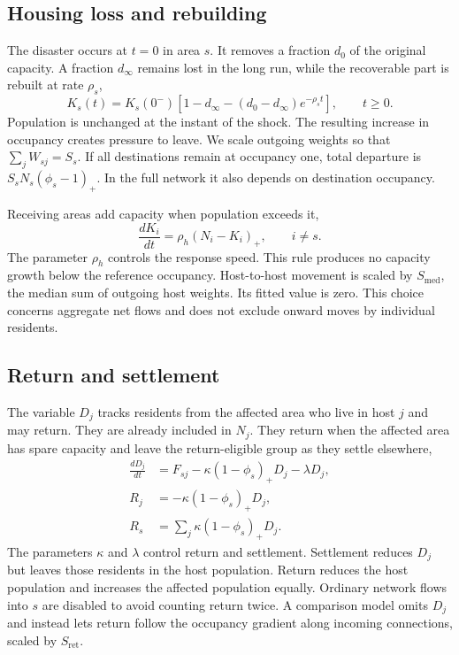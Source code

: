 \documentclass[11pt]{article}
\begin{document}
\subsection*{Housing loss and rebuilding}

The disaster occurs at $t=0$ in area $s$. It removes a fraction $d_0$ of the original capacity. A fraction $d_\infty$ remains lost in the long run, while the recoverable part is rebuilt at rate $\rho_s$,
\begin{equation}
K_s(t)=K_s(0^-)\left[1-d_\infty-(d_0-d_\infty)e^{-\rho_s t}\right],\qquad t\geq0.
\label{eq:Ks}
\end{equation}
Population is unchanged at the instant of the shock. The resulting increase in occupancy creates pressure to leave. We scale outgoing weights so that $\sum_jW_{sj}=S_s$. If all destinations remain at occupancy one, total departure is $S_sN_s(\phi_s-1)_+$. In the full network it also depends on destination occupancy.

Receiving areas add capacity when population exceeds it,
\begin{equation}
\frac{dK_i}{dt}=\rho_h(N_i-K_i)_+,\qquad i\ne s.
\label{eq:hosts}
\end{equation}
The parameter $\rho_h$ controls the response speed. This rule produces no capacity growth below the reference occupancy. Host-to-host movement is scaled by $S_{\text{med}}$, the median sum of outgoing host weights. Its fitted value is zero. This choice concerns aggregate net flows and does not exclude onward moves by individual residents.

\subsection*{Return and settlement}

The variable $D_j$ tracks residents from the affected area who live in host $j$ and may return. They are already included in $N_j$. They return when the affected area has spare capacity and leave the return-eligible group as they settle elsewhere,
\begin{equation}
\begin{aligned}
\frac{dD_j}{dt} &= F_{sj}-\kappa(1-\phi_s)_+D_j-\lambda D_j, \\
R_j &= -\kappa(1-\phi_s)_+D_j, \\
R_s &= \sum_j\kappa(1-\phi_s)_+D_j .
\end{aligned}
\label{eq:D}
\end{equation}
The parameters $\kappa$ and $\lambda$ control return and settlement. Settlement reduces $D_j$ but leaves those residents in the host population. Return reduces the host population and increases the affected population equally. Ordinary network flows into $s$ are disabled to avoid counting return twice. A comparison model omits $D_j$ and instead lets return follow the occupancy gradient along incoming connections, scaled by $S_{\text{ret}}$.
\end{document}
